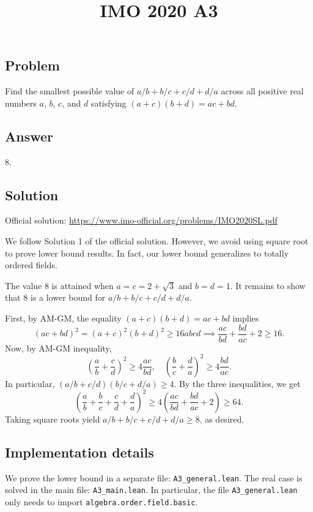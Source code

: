 \documentclass{article}
\title{IMO 2020 A3}
\author{}
\date{}
\begin{document}
\maketitle



\subsection*{Problem}

Find the smallest possible value of $a/b + b/c + c/d + d/a$ across all positive real numbers $a$, $b$, $c$, and $d$ satisfying $(a + c)(b + d) = ac + bd$.



\subsection*{Answer}

$8$.


\subsection*{Solution}

Official solution: \url{https://www.imo-official.org/problems/IMO2020SL.pdf}

We follow Solution 1 of the official solution.
However, we avoid using square root to prove lower bound results.
In fact, our lower bound generalizes to totally ordered fields.

The value $8$ is attained when $a = c = 2 + \sqrt{3}$ and $b = d = 1$.
It remains to show that $8$ is a lower bound for $a/b + b/c + c/d + d/a$.

First, by AM-GM, the equality $(a + c)(b + d) = ac + bd$ implies
\[ (ac + bd)^2 = (a + c)^2 (b + d)^2 \geq 16 abcd \implies \frac{ac}{bd} + \frac{bd}{ac} + 2 \geq 16. \]
Now, by AM-GM inequality,
\[ \left(\frac{a}{b} + \frac{c}{d}\right)^2 \geq 4\frac{ac}{bd}, \quad \left(\frac{b}{c} + \frac{d}{a}\right)^2 \geq 4\frac{bd}{ac}. \]
In particular, $(a/b + c/d)(b/c + d/a) \geq 4$.
By the three inequalities, we get
\[ \left(\frac{a}{b} + \frac{b}{c} + \frac{c}{d} + \frac{d}{a}\right)^2 \geq 4\left(\frac{ac}{bd} + \frac{bd}{ac} + 2\right) \geq 64. \]
Taking square roots yield $a/b + b/c + c/d + d/a \geq 8$, as desired.



\subsection*{Implementation details}

We prove the lower bound in a separate file: \texttt{A3\_general.lean}.
The real case is solved in the main file: \texttt{A3\_main.lean}.
In particular, the file \texttt{A3\_general.lean} only needs to import \texttt{algebra.order.field.basic}.
\end{document}
